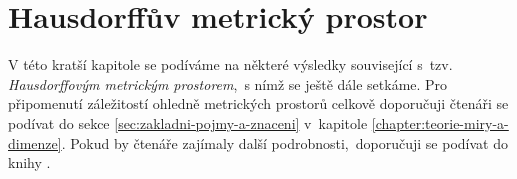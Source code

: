 \chapter{Hausdorffův metrický prostor}\label{chapter:hausdorffuv-mp}

V této kratší kapitole se podíváme na některé výsledky související s~tzv. \emph{Hausdorffovým metrickým prostorem},~s nímž se ještě dále setkáme. Pro připomenutí záležitostí ohledně metrických prostorů celkově doporučuji čtenáři se podívat do sekce \ref{sec:zakladni-pojmy-a-znaceni} v~kapitole \ref{chapter:teorie-miry-a-dimenze}. Pokud by čtenáře zajímaly další podrobnosti,~doporučuji se podívat do knihy \citep[str. 71]{Edgar2008}.


